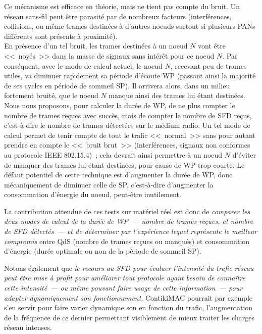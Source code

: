 \begin{enumerate}
\smallskip

Ce mécanisme est efficace en théorie, mais ne tient pas compte du bruit.
Un réseau sans-fil peut être parasité par de nombreux facteurs
(interférences, collisions, ou même trames destinées à d'autres noeuds
surtout si plusieurs PANs différents sont présents à proximité).\\
En présence d'un tel bruit, les trames destinées à un noeud $N$ vont
être <<~noyés~>> dans la masse de signaux sans intérêt pour ce noeud $N$.
Par conséquent, avec le mode de calcul actuel, le noeud $N$, recevant peu
de trames utiles, va diminuer rapidement sa période d'écoute WP (passant
ainsi la majorité de ses cycles en période de sommeil SP). Il arrivera
alors, dans un milieu fortement bruité, que le noeud $N$ manque ainsi
des trames lui étant destinées.\\
Nous nous proposons, pour calculer la durée de WP, de ne plus compter le
nombre de trames reçues avec succès, mais de compter le nombre de SFD reçus,
c'est-à-dire le nombre de trames détectées sur le médium radio. Un tel
mode de calcul permet de tenir compte de tout le trafic <<~normal~>>
sans pour autant prendre en compte le <<~bruit brut~>> (interférences,
signaux non conformes au protocole IEEE 802.15.4)~; cela devrait ainsi
permettre à un noeud $N$ d'éviter de manquer des trames lui étant
destinées, pour cause de WP trop courte. Le défaut potentiel de cette
technique est d'augmenter la durée de WP, donc mécaniquement de diminuer
celle de SP, c'est-à-dire d'augmenter la consommation d'énergie du noeud,
peut-être inutilement.

La contribution attendue de ces tests sur matériel réel est donc de
\emph{comparer les deux modes de calcul de la durée de WP~--- nombre
de trames reçues, et nombre de SFD détectés~--- et de déterminer par
l'expérience lequel représente le meilleur compromis} entre QdS (nombre
de trames reçues ou manqués) et consommation d'énergie (durée optimale
ou non de la période de sommeil SP).

Notons également que \emph{le recours au SFD pour évaluer l'intensité
du trafic réseau peut être mise à profit pour améliorer tout protocole
ayant besoin de connaître cette intensité~--- ou même pouvant faire usage
de cette information~--- pour adapter dynamiquement son fonctionnement}.
ContikiMAC pourrait par exemple s'en servir pour faire varier dynamique
son  en fonction du trafic, l'augmentation
de la fréquence de ce dernier permettant visiblement de mieux traiter
les charges réseau intenses.


\end{enumerate}
